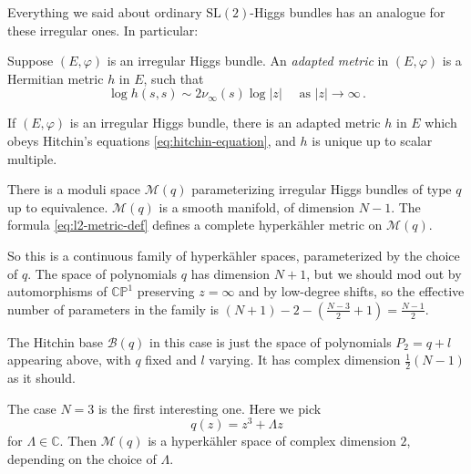 \documentclass[12pt,letterpaper,reqno]{article}
\numberwithin{equation}{section}
\newcommand{\cB}{\ensuremath{\mathcal B}}
\newcommand{\cM}{\ensuremath{\mathcal M}}
\newcommand{\bbC}{\ensuremath{\mathbb C}}
\newcommand{\bbP}{\ensuremath{\mathbb P}}
\newcommand{\hk}{hyperk\"ahler\xspace}
\newcommand{\abs}[1]{\lvert#1\rvert}
\newcommand{\ti}[1]{\textit{#1}}
\newcommand{\SL}{\mathrm{SL}}
\newcommand{\fixme}[1]{{\color{orange}{[#1]}}}
\begin{document}
Everything we said about ordinary $\SL(2)$-Higgs bundles has an analogue for these 
irregular ones. 
In particular:

\begin{defn}
Suppose $(E,\varphi)$ is an irregular Higgs bundle. An \ti{adapted metric} in $(E,\varphi)$ is a Hermitian metric $h$ in $E$, such that
\begin{equation}
\log h(s,s) \sim 2 \nu_\infty(s) \log \abs{z} \quad \text{ as } \abs{z} \to \infty \, . 
\end{equation}
\end{defn}

\begin{thm}
If $(E,\varphi)$ is an irregular Higgs bundle, there is an adapted metric $h$ in $E$ which obeys Hitchin's equations \eqref{eq:hitchin-equation}, and $h$ is unique up to scalar multiple. \fixme{Mochizuki}
\end{thm}

\begin{thm}
There is a moduli space $\cM(q)$ parameterizing irregular Higgs bundles of type $q$ up to equivalence.
$\cM(q)$ is a smooth manifold, of dimension $N-1$.
The formula \eqref{eq:l2-metric-def} defines a complete \hk metric on $\cM(q)$.
\fixme{Biquard-Boalch plus epsilon}
\end{thm}

So this is a continuous family of \hk spaces, parameterized by the choice of $q$.
The space of polynomials $q$ has dimension $N+1$, but we should mod out by automorphisms
of $\bbC\bbP^1$ preserving $z = \infty$ and by low-degree shifts,
so the effective number of parameters in the family 
is $(N+1) - 2 - (\frac{N-3}{2} + 1) = \frac{N-1}{2}$.

The Hitchin base $\cB(q)$ in this case is just the space of polynomials 
$P_2 = q + l$ appearing above, with $q$ fixed and $l$ varying.
It has complex dimension $\frac12(N-1)$ as it should.

\begin{example}
The case $N=3$ is the first interesting one. Here we pick
\begin{equation}
  q(z) = z^3 + \Lambda z
\end{equation}
for $\Lambda \in \bbC$. Then $\cM(q)$ is a \hk space of complex dimension $2$,
depending on the choice of $\Lambda$. \fixme{show picture of $\cB(q)$}
\end{example}


\end{document}
